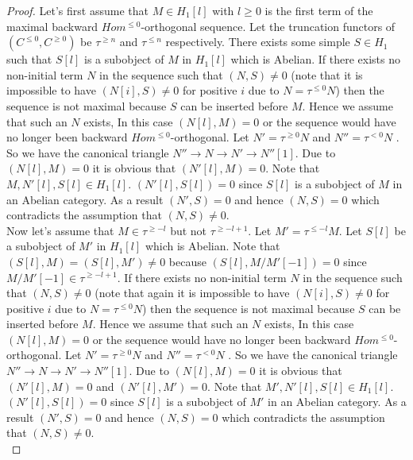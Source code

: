\begin{proof}
\indent Let's first assume that $M\in H_1[l]$ with $l\geq 0$ is the first term of the maximal backward $Hom^{\leq 0}$-orthogonal sequence. Let the truncation functors of $(C^{\leq 0}, C^{\geq 0})$ be $\tau^{\geq n}$ and $\tau^{\leq n}$ respectively. There exists some simple $S\in H_1$ such that $S[l]$ is a subobject of $M$ in $H_1[l]$ which is Abelian. If there exists no non-initial term $N$ in the sequence such that $(N,S) \neq 0$ (note that it is impossible to have $(N[i],S)\neq 0$ for positive $i$ due to $N=\tau^{\leq 0}N$) then the sequence is not maximal because $S$ can be inserted before $M$. Hence we assume that such an $N$ exists, In this case $(N[l],M)= 0$ or the sequence would have no longer been backward $Hom^{\leq 0}$-orthogonal. Let $N' = \tau^{\geq 0}N$ and $N'' = \tau^{<0} N$ . So we have the canonical triangle $N''\to N\to N'\to N''[1]$. Due to $(N[l],M) = 0$ it is obvious that $(N'[l],M) = 0$. Note that $M, N'[l], S[l]\in H_1[l]$. $(N'[l],S[l]) = 0$ since $S[l]$ is a subobject of $M$ in an Abelian category. As a result $(N',S) = 0$ and hence $(N,S) = 0$ which contradicts the assumption that $(N,S)\neq 0$.\\
\indent Now let's assume that $M\in \tau^{\geq -l}$ but not $\tau^{\geq -l+1}$. Let $M' = \tau^{\leq -l}M$. Let $S[l]$ be a subobject of $M'$ in $H_1[l]$ which is Abelian. Note that $(S[l],M) = (S[l],M')\neq 0$ because $(S[l], M/M'[-1]) = 0$ since $M/M'[-1]\in \tau^{\geq -l+1}$. If there exists no non-initial term $N$ in the sequence such that $(N,S) \neq 0$ (note that again it is impossible to have $(N[i],S)\neq 0$ for positive $i$ due to $N=\tau^{\leq 0}N$) then the sequence is not maximal because $S$ can be inserted before $M$. Hence we assume that such an $N$ exists, In this case $(N[l],M)= 0$ or the sequence would have no longer been backward $Hom^{\leq 0}$-orthogonal. Let $N' = \tau^{\geq 0}N$ and $N'' = \tau^{<0} N$ . So we have the canonical triangle $N''\to N\to N'\to N''[1]$. Due to $(N[l],M) = 0$ it is obvious that $(N'[l],M) = 0$ and $(N'[l],M')=0$. Note that $M', N'[l], S[l]\in H_1[l]$. $(N'[l],S[l]) = 0$ since $S[l]$ is a subobject of $M'$ in an Abelian category. As a result $(N',S) = 0$ and hence $(N,S) = 0$ which contradicts the assumption that $(N,S)\neq 0$.\\
\end{proof}
